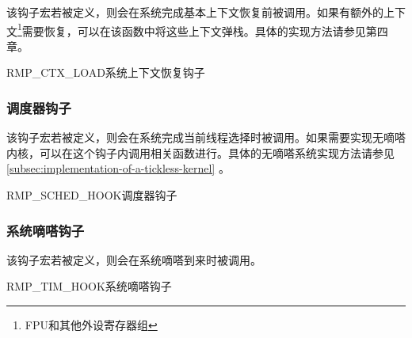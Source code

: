 该钩子宏若被定义，则会在系统完成基本上下文恢复前被调用。如果有额外的上下文\footnote{FPU和其他外设寄存器组}需要恢复，可以在该函数中将这些上下文弹栈。具体的实现方法请参见第四章。

\begin{apidesc}{RMP\_CTX\_LOAD}{系统上下文恢复钩子}
    \begin{apiparams}
    \end{apiparams}
    \begin{apiret}
    \end{apiret}
\end{apidesc}

\subsubsection{调度器钩子}\label{subsubsec:scheduler-hook}

该钩子宏若被定义，则会在系统完成当前线程选择时被调用。如果需要实现无嘀嗒内核，可以在这个钩子内调用相关函数进行。具体的无嘀嗒系统实现方法请参见\ref{subsec:implementation-of-a-tickless-kernel}
。

\begin{apidesc}{RMP\_SCHED\_HOOK}{调度器钩子}
    \begin{apiparams}
    \end{apiparams}
    \begin{apiret}
    \end{apiret}
\end{apidesc}

\subsubsection{系统嘀嗒钩子}\label{subsubsec:system-tick-hook}

该钩子宏若被定义，则会在系统嘀嗒到来时被调用。

\begin{apidesc}{RMP\_TIM\_HOOK}{系统嘀嗒钩子}
    \begin{apiparams}
    \end{apiparams}
    \begin{apiret}
    \end{apiret}
\end{apidesc}

